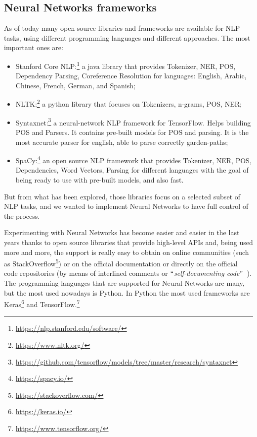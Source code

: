 \subsection{Neural Networks frameworks}
\label{implementationNN}

As of today many open source libraries and frameworks are available for NLP tasks, using different programming languages and different approaches. The most important ones are:

\begin{itemize}
	\item Stanford Core NLP:\footnote{\url{https://nlp.stanford.edu/software/}} a java library that provides Tokenizer, NER, POS, Dependency Parsing, Coreference Resolution for languages: English, Arabic, Chinese, French, German, and Spanish;

	\item NLTK:\footnote{\url{https://www.nltk.org/}} a python library that focuses on Tokenizers, n-grams, POS, NER;

	\item Syntaxnet:\footnote{\url{https://github.com/tensorflow/models/tree/master/research/syntaxnet}} a neural-network NLP framework for TensorFlow. Helps building POS and Parsers. It contains pre-built models for POS and parsing. It is the most accurate parser for english, able to parse correctly garden-paths;

	\item SpaCy:\footnote{\url{https://spacy.io/}} an open source NLP framework that provides Tokenizer, NER, POS, Dependencies, Word Vectors, Parsing for different languages with the goal of being ready to use with pre-built models, and also fast.
\end{itemize}

But from what has been explored, those libraries focus on a selected subset of NLP tasks, and we wanted to implement Neural Networks to have full control of the process.

Experimenting with Neural Networks has become easier and easier in the last years thanks to open source libraries that provide high-level APIs and, being used more and more, the support is really easy to obtain on online communities (such as StackOverflow\footnote{\url{https://stackoverflow.com/}}) or on the official documentation or directly on the official code repositories (by means of interlined comments or $``$\textit{self-documenting code}$"$~\cite{raskin2005comments}). The programming languages that are supported for Neural Networks are many, but the most used nowadays is Python. In Python the most used frameworks are Keras\footnote{\url{https://keras.io/}} and TensorFlow.\footnote{\url{https://www.tensorflow.org/}}

